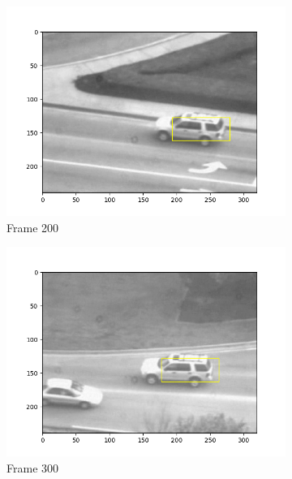 \documentclass{article} %
\begin{document}
\begin{figure}[H]
\begin{subfigure}[b]{0.30\textwidth}
            \includegraphics[width=\textwidth]{q1,3_frame200.png}
            \caption{Frame 200}
        \end{subfigure}
        \begin{subfigure}[b]{0.30\textwidth}
            \centering
            \includegraphics[width=\textwidth]{q1,3_frame300.png}
            \caption{Frame 300}
        \end{subfigure}
        \begin{subfigure}[b]{0.30\textwidth}
            \centering

\end{subfigure}
\end{figure}
\end{document}
